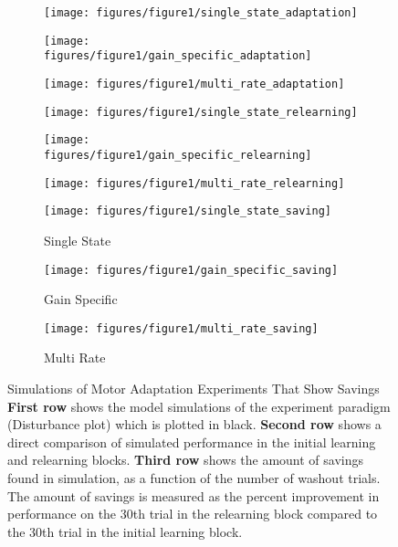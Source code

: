 \documentclass[9pt,twocolumn]{paper-template}
\begin{document}
\begin{figure*}[h!]
  \centering
  \begin{subfigure}[b]{0.32\linewidth}
    \texttt{[image: figures/figure1/single\_state\_adaptation]}
  \end{subfigure}
  \begin{subfigure}[b]{0.32\linewidth}
    \texttt{[image: figures/figure1/gain\_specific\_adaptation]}
  \end{subfigure}
   \begin{subfigure}[b]{0.32\linewidth}
    \texttt{[image: figures/figure1/multi\_rate\_adaptation]}
  \end{subfigure}
    \begin{subfigure}[b]{0.32\linewidth}
    \texttt{[image: figures/figure1/single\_state\_relearning]}
  \end{subfigure}
  \begin{subfigure}[b]{0.32\linewidth}
    \texttt{[image: figures/figure1/gain\_specific\_relearning]}
  \end{subfigure}
   \begin{subfigure}[b]{0.32\linewidth}
    \texttt{[image: figures/figure1/multi\_rate\_relearning]}
  \end{subfigure}
      \begin{subfigure}[b]{0.32\linewidth}
    \texttt{[image: figures/figure1/single\_state\_saving]}
    \caption{Single State}
  \end{subfigure}
  \begin{subfigure}[b]{0.32\linewidth}
    \texttt{[image: figures/figure1/gain\_specific\_saving]}
        \caption{Gain Specific}
  \end{subfigure}
   \begin{subfigure}[b]{0.32\linewidth}
    \texttt{[image: figures/figure1/multi\_rate\_saving]}
        \caption{Multi Rate}
  \end{subfigure}
  \caption{Simulations of Motor Adaptation Experiments That Show Savings\\
  \textbf{First row} shows the model simulations of the experiment paradigm (Disturbance plot) which is plotted in black. \textbf{Second row} shows a direct comparison of simulated performance in the initial learning and relearning blocks.  \textbf{Third row} shows the amount of savings found in simulation, as a function of the number of washout trials. The amount of savings is measured as the percent improvement in performance on the 30th trial in the relearning block compared to the 30th trial in the initial learning block. 
}
  \label{fig:figure1}
\end{figure*}
\end{document}
